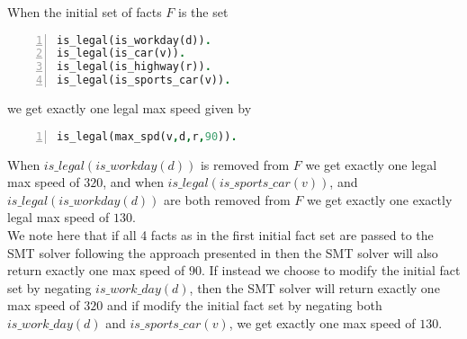 When the initial set of facts $F$ is the set
\begin{lstlisting}[language=Prolog, numbers=left]
is_legal(is_workday(d)).
is_legal(is_car(v)).
is_legal(is_highway(r)).
is_legal(is_sports_car(v)).
\end{lstlisting}
we get exactly one legal max speed given by 
\begin{lstlisting}[language=Prolog, numbers=left]
is_legal(max_spd(v,d,r,90)).
\end{lstlisting}
When $is\_legal(is\_workday(d))$ is removed from $F$ we get exactly one legal max speed of $320$, and when  $is\_legal(is\_sports\_car(v))$, and $is\_legal(is\_workday(d))$ are both removed from $F$ we get exactly one exactly legal max speed of $130$.\\
We note here that if all 4 facts as in the first initial fact set are passed to the SMT solver following the approach presented in  then the SMT solver will also return exactly one max speed of $90$. If instead we choose to modify the initial fact set by negating $is\_work\_day(d)$, then the SMT solver will return exactly one max speed of $320$ and if modify the initial fact set by negating both  $is\_work\_day(d)$ and  $is\_sports\_car(v)$, we get exactly one max speed of $130$.







